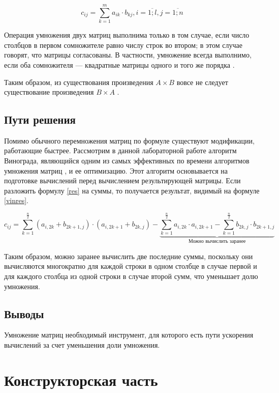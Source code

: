 \documentclass[a4paper,12pt]{article}
\begin{document}
\begin{equation}\label{res}
    c_{ij} = \sum_{k=1}^m a_{ik} \cdot b_{kj}, i = \overline{1;l}, j = \overline{1;n}
\end{equation}

Операция умножения двух матриц выполнима только в том случае, если число столбцов в
первом сомножителе равно числу строк во втором; в этом случае говорят, что матрицы
согласованы. В частности, умножение всегда выполнимо, если оба сомножителя —
квадратные матрицы одного и того же порядка \cite{litr}.

Таким образом, из существования произведения $A \times B$ вовсе не следует
существование произведения $B \times A$ \cite{litr}.
\subsection{Пути решения}

Помимо обычного перемножения матриц по формуле существуют модификации, работающие
быстрее. Рассмотрим в данной лабораторной работе алгоритм Винограда, являющийся одним
из самых эффективных по времени алгоритмов умножения матриц \cite{haskell},
и ее оптимизацию. Этот алгоритм основывается на подготовке вычислений перед вычислением
результирующей матрицы. Если разложить формулу \ref{res} на суммы, то получается
результат, видимый на формуле \ref{vinres}.

\begin{equation}\label{vinres}
    c_{ij} =
    \sum_{k=1}^{\frac{n}{2}} (a_{i,2k} + b_{2k+1,j}) \cdot (a_{i,2k+1} + b_{2k,j}) -
    \underbrace{\sum_{k=1}^{\frac{n}{2}} a_{i,2k} \cdot a_{i,2k+1} -
    \sum_{k=1}^{\frac{n}{2}} b_{2k,j} \cdot b_{2k+1,j}}_\text{Можно вычислить заранее}
\end{equation}

Таким образом, можно заранее вычислить две последние суммы, поскольку они вычисляются
многократно для каждой строки в одном столбце в случае первой и для каждого столбца
из одной строки в случае второй сумм, что уменьшает долю умножения\cite{haskell}.

\subsection{Выводы}

Умножение матриц необходимый инструмент, для которого есть пути ускорения вычислений
за счет уменьшения доли умножения.

\newpage
\section{Конструкторская часть}
\end{document}
